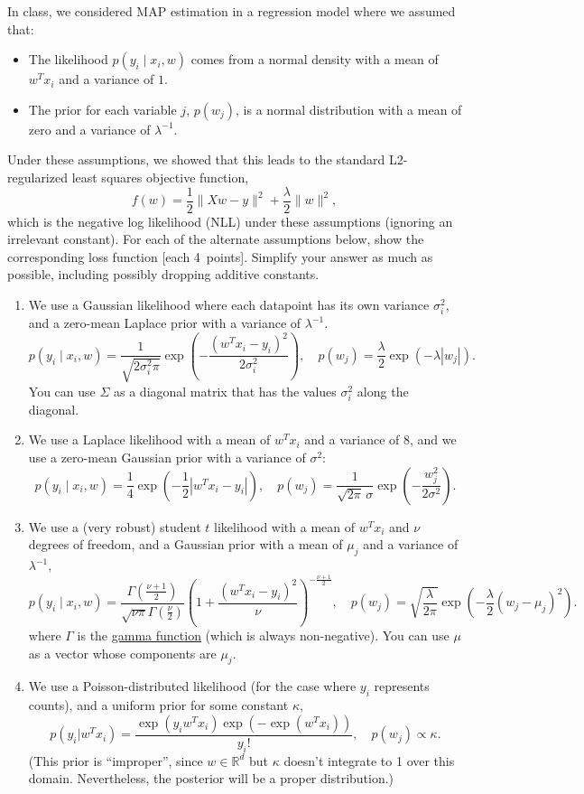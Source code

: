 \documentclass{article}
\newcommand{\blu}[1]{{\textcolor{blu}{#1}}}
\let\ask\blu
\newcommand\pts[1]{\textcolor{pointscolour}{[#1~points]}}
\def\R{\mathbb{R}}
\newcommand{\norm}[1]{\lVert #1 \rVert}
\begin{document}
In class, we considered MAP estimation in a regression model where we assumed that:
\begin{itemize}
\item The likelihood $p(y_i \mid x_i, w)$ comes from a normal density with a mean of $w^Tx_i$ and a variance of $1$.
\item The prior for each variable $j$, $p(w_j)$, is a normal distribution with a mean of zero and a variance of $\lambda^{-1}$.
\end{itemize}
Under these assumptions, we showed that this leads to the standard L2-regularized least squares objective function,
\[
f(w) = \frac{1}{2}\norm{Xw - y}^2 + \frac \lambda 2 \norm{w}^2,
\]
which is the negative log likelihood (NLL) under these assumptions (ignoring an irrelevant constant).
\ask{For each of the alternate assumptions below, show the corresponding loss function} \pts{each 4}. Simplify your answer as much as possible, including possibly dropping additive constants.
\begin{enumerate}

\item We use a Gaussian likelihood where each datapoint has its own variance $\sigma_i^2$, and a zero-mean Laplace prior with a variance of $\lambda^{-1}$.
\[
p(y_i \mid x_i,w) = \frac{1}{\sqrt{2\sigma_i^2\pi}}\exp\left(-\frac{(w^Tx_i - y_i)^2}{2\sigma_i^2}\right), \quad p(w_j) = \frac{\lambda}{2}\exp(-\lambda|w_j|).
\]
You can use $\Sigma$ as a diagonal matrix that has the values $\sigma_i^2$ along the diagonal.


\item We use a Laplace likelihood with a mean of $w^Tx_i$ and a variance of $8$, and we use a zero-mean Gaussian prior with a variance of $\sigma^2$:
\[
p(y_i \mid x_i, w) = \frac14 \exp\left(- \frac12 |w^Tx_i - y_i| \right), \quad
p(w_j) = \frac{1}{\sqrt{2\pi} \, \sigma} \exp\left(-\frac{w_j^2}{2\sigma^2} \right).
\]



 \item We use a (very robust) student $t$ likelihood with a mean of $w^Tx_i$ and $\nu$ degrees of freedom, and a Gaussian prior with a mean of $\mu_j$ and a variance of $\lambda^{-1}$,
\[
  p(y_i \mid x_i, w) = \frac{\Gamma\left(\frac{\nu + 1}{2}\right)}{\sqrt{\nu\pi}\Gamma\left(\frac \nu 2\right)}
                       \left(1 + \frac{(w^T x_i - y_i)^2}{\nu} \right)^{-\frac{\nu+1}{2}}
, \quad
  p(w_j) = \sqrt{\frac{\lambda}{2\pi}} \exp\left( -\frac\lambda2 (w_j - \mu_j)^2 \right).
\]
where $\Gamma$ is the \href{https://en.wikipedia.org/wiki/Gamma_function}{gamma function} (which is always non-negative).
You can use $\mu$ as a vector whose components are $\mu_j$.


\item We use a Poisson-distributed likelihood (for the case where $y_i$ represents counts), and a uniform prior for some constant $\kappa$,
\[
p(y_i | w^Tx_i) = \frac{\exp(y_iw^Tx_i)\exp(-\exp(w^Tx_i))}{y_i!}, \quad p(w_j) \propto \kappa.
\]
(This prior is 	``improper'', since $w\in\R^d$ but $\kappa$ doesn't integrate to 1 over this domain. Nevertheless, the posterior will be a proper distribution.)

\end{enumerate}
\end{document}
